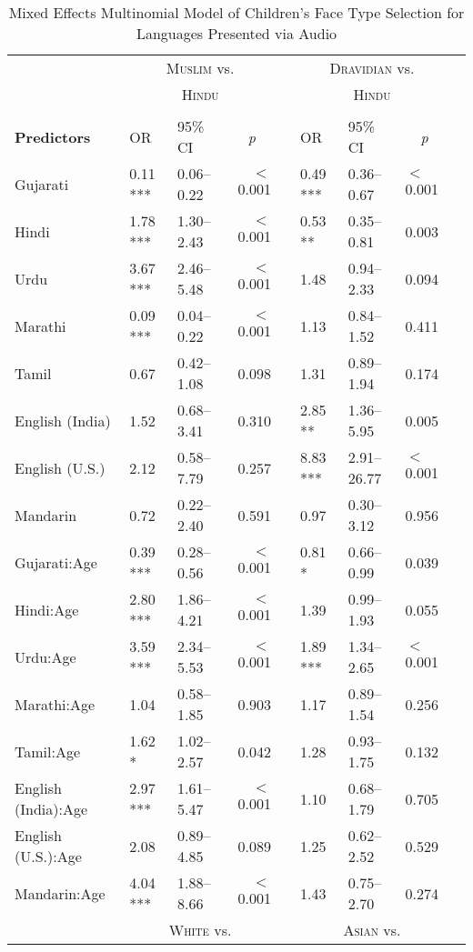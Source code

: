 \begin{table}[ht]
\small
\caption{Mixed Effects Multinomial Model of Children's Face Type Selection for Languages Presented via Audio}\label{tab:famod}
    \centering
    \vspace{5pt}
    \setlength{\tabcolsep}{1.75pt} 
\begin{threeparttable}
\begin{tabular}{lllrllllr}
 \toprule
& \multicolumn{3}{c}{\textsc{Muslim} vs.} & & \multicolumn{3}{c}{\textsc{Dravidian} vs.}\\
& \multicolumn{3}{c}{\textsc{Hindu}\tnote{a}} & & \multicolumn{3}{c}{\textsc{Hindu}\tnote{a}}\\
\cline{2-4} \cline{6-8} \\[-.75em]
\textbf{Predictors} & OR & 95\% CI & \multicolumn{1}{c}{\textit{p}} & & OR & 95\% CI & \multicolumn{1}{c}{\textit{p}} \\ 
\midrule
Gujarati & 0.11 *** & 0.06--0.22 & $<$0.001 &  & 0.49 *** & 0.36--0.67 & $<$0.001 \\ 
Hindi & 1.78 *** & 1.30--2.43 & $<$0.001 &  & 0.53 ** & 0.35--0.81 & 0.003 \\ 
Urdu & 3.67 *** & 2.46--5.48 & $<$0.001 &  & 1.48 & 0.94--2.33 & 0.094 \\ 
Marathi & 0.09 *** & 0.04--0.22 & $<$0.001 &  & 1.13 & 0.84--1.52 & 0.411 \\ 
Tamil & 0.67 & 0.42--1.08 & 0.098 &  & 1.31 & 0.89--1.94 & 0.174 \\ 
English (India) & 1.52 & 0.68--3.41 & 0.310 &  & 2.85 ** & 1.36--5.95 & 0.005 \\ 
English (U.S.) & 2.12 & 0.58--7.79 & 0.257 &  & 8.83 *** & 2.91--26.77 & $<$0.001 \\ 
Mandarin & 0.72 & 0.22--2.40 & 0.591 &  & 0.97 & 0.30--3.12 & 0.956 \\ 
Gujarati:Age\tnote{b} & 0.39 *** & 0.28--0.56 & $<$0.001 &  & 0.81 * & 0.66--0.99 & 0.039 \\ 
Hindi:Age\tnote{b} & 2.80 *** & 1.86--4.21 & $<$0.001 &  & 1.39 & 0.99--1.93 & 0.055 \\ 
Urdu:Age\tnote{b} & 3.59 *** & 2.34--5.53 & $<$0.001 &  & 1.89 *** & 1.34--2.65 & $<$0.001 \\ 
Marathi:Age\tnote{b} & 1.04 & 0.58--1.85 & 0.903 &  & 1.17 & 0.89--1.54 & 0.256 \\ 
Tamil:Age\tnote{b} & 1.62 * & 1.02--2.57 & 0.042 &  & 1.28 & 0.93--1.75 & 0.132 \\ 
English (India):Age\tnote{b} & 2.97 *** & 1.61--5.47 & $<$0.001 &  & 1.10 & 0.68--1.79 & 0.705 \\ 
English (U.S.):Age\tnote{b} & 2.08 & 0.89--4.85 & 0.089 &  & 1.25 & 0.62--2.52 & 0.529 \\ 
Mandarin:Age\tnote{b} & 4.04 *** & 1.88--8.66 & $<$0.001 &  & 1.43 & 0.75--2.70 & 0.274 \\ 
\midrule
& 
\multicolumn{3}{c}{\textsc{White} vs.} & &
\multicolumn{3}{c}{\textsc{Asian} vs.}\\


\end{tabular}
\end{threeparttable}
\end{table}
